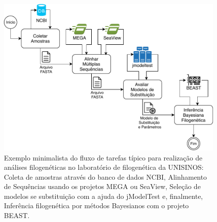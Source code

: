 \documentclass[english,brazilian]{UNISINOSmonografia} %
\newcommand\defaultFigureWidth{0.9}
\begin{document}
\begin{figure}[tb]
	\centering%
	\begin{minipage}{\defaultFigureWidth\textwidth}
		\caption[Exemplo minimalista do fluxo de tarefas típico para realização de análises filogenéticas no laboratório de filogenética da UNISINOS]{Exemplo minimalista do fluxo de tarefas típico para realização de análises filogenéticas no laboratório de filogenética da UNISINOS: Coleta de amostras através do banco de dados NCBI, Alinhamento de Sequências usando os projetos MEGA ou SeaView, Seleção de modelos se substituição com a ajuda do jModelTest e, finalmente, Inferência filogenética por métodos Bayesianos com o projeto BEAST.}
		\label{fig:modelo-workflow-unisinos}
		\vspace{1ex}
		\includegraphics[width=\textwidth]{workflow-biologia}
	\end{minipage}
\end{figure}
\end{document}
